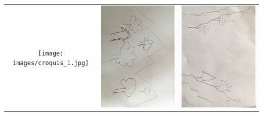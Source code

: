 \documentclass[a4paper, 12pt]{report}
\begin{document}
\begin{center}
  \centering
  \begin{tabular}{ccc}
    \texttt{[image: images/croquis\_1.jpg]}&
    \includegraphics[angle=90, height=0.15\textheight]{images/croquis_2.jpg}&
    \includegraphics[angle=90, height=0.15\textheight]{images/croquis_4.jpg}\\

\end{tabular}
\end{center}
\end{document}
